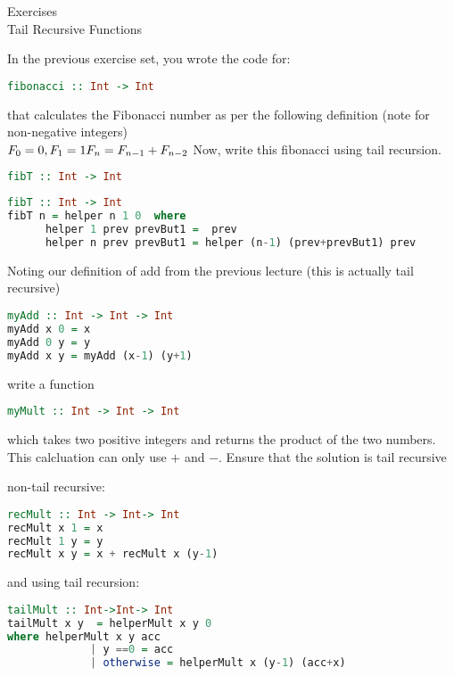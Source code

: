 \documentclass{article}
\newcommand\ExTitle{Tail Recursive Functions}
\newcommand\fullExTitle{Exercises\\ \ExTitle }
\begin{document}
\begin{Huge}
	\begin{center}
	\fullExTitle
	\end{center}
\end{Huge}
\begin{Exercise}
In the previous exercise set, you wrote the code for:
\begin{lstlisting}[language=Haskell]
	fibonacci :: Int -> Int
\end{lstlisting}
that calculates the Fibonacci number as per the following definition (note for non-negative integers)\\
$
F_{0} = 0, F_{1} = 1 \\
F_{n} = F_{n-1} + F_{n-2}
$
Now, write this fibonacci using tail recursion.

\begin{lstlisting}[language=Haskell]
	fibT :: Int -> Int
\end{lstlisting}
\end{Exercise}
\begin{Answer}
\begin{lstlisting}[language=Haskell]
fibT :: Int -> Int
fibT n = helper n 1 0  where
	  helper 1 prev prevBut1 =  prev 
	  helper n prev prevBut1 = helper (n-1) (prev+prevBut1) prev
\end{lstlisting}
\end{Answer}
\begin{Exercise}
Noting our definition of add from the previous lecture (this is actually tail recursive)
\begin{lstlisting}[language=Haskell]
myAdd :: Int -> Int -> Int
myAdd x 0 = x
myAdd 0 y = y
myAdd x y = myAdd (x-1) (y+1)
\end{lstlisting}
write a function 
\begin{lstlisting}[language=Haskell]
myMult :: Int -> Int -> Int
\end{lstlisting}
which takes two positive integers and returns the product of the two numbers. This calcluation can only use $+$ and $-$.
Ensure that the solution is tail recursive
\end{Exercise}
\begin{Answer}
non-tail recursive:
\begin{lstlisting}[language=Haskell]
recMult :: Int -> Int-> Int
recMult x 1 = x
recMult 1 y = y
recMult x y = x + recMult x (y-1)
\end{lstlisting}
and using tail recursion: 
\begin{lstlisting}[language=Haskell]
tailMult :: Int->Int-> Int
tailMult x y  = helperMult x y 0
where helperMult x y acc     
             | y ==0 = acc 
             | otherwise = helperMult x (y-1) (acc+x)
\end{lstlisting}
\end{Answer}
\end{document}
